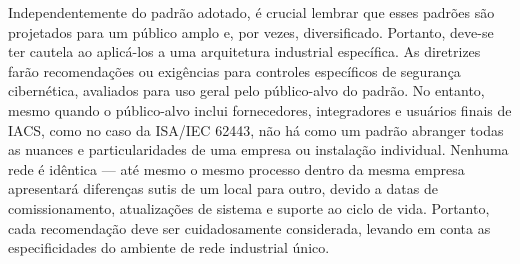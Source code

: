         Independentemente do padrão adotado, é crucial lembrar que esses padrões são projetados para um público amplo e, por vezes, diversificado. Portanto, deve-se ter cautela ao aplicá-los a uma arquitetura industrial específica. As diretrizes farão recomendações ou exigências para controles específicos de segurança cibernética, avaliados para uso geral pelo público-alvo do padrão. No entanto, mesmo quando o público-alvo inclui fornecedores, integradores e usuários finais de IACS, como no caso da ISA/IEC 62443, não há como um padrão abranger todas as nuances e particularidades de uma empresa ou instalação individual. Nenhuma rede é idêntica — até mesmo o mesmo processo dentro da mesma empresa apresentará diferenças sutis de um local para outro, devido a datas de comissionamento, atualizações de sistema e suporte ao ciclo de vida. Portanto, cada recomendação deve ser cuidadosamente considerada, levando em conta as especificidades do ambiente de rede industrial único.
